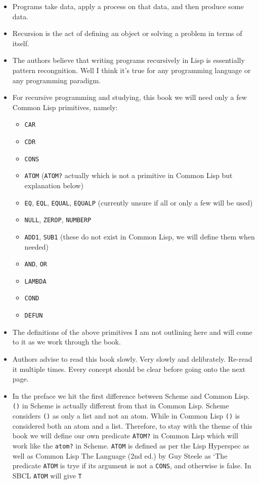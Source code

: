 \documentclass[11pt]{article}
\begin{document}
\begin{itemize}
\item Programs take data, apply a process on that data, and then produce some data.
\item Recursion is the act of defining an object or solving a problem in terms of itself.
\item The authors believe that writing programs recursively in Lisp is essentially pattern recongnition. Well I think
it's true for any programming language or any programming paradigm.
\item For recursive programming and studying, this book we will need only a few Common Lisp primitives, namely:
\begin{itemize}
\item \texttt{CAR}
\item \texttt{CDR}
\item \texttt{CONS}
\item \texttt{ATOM} (\texttt{ATOM?} actually which is not a primitive in Common Lisp but explanation below)
\item \texttt{EQ}, \texttt{EQL}, \texttt{EQUAL}, \texttt{EQUALP} (currently unsure if all or only a few will be used)
\item \texttt{NULL}, \texttt{ZEROP}, \texttt{NUMBERP}
\item \texttt{ADD1}, \texttt{SUB1} (these do not exist in Common Lisp, we will define them when needed)
\item \texttt{AND}, \texttt{OR}
\item \texttt{LAMBDA}
\item \texttt{COND}
\item \texttt{DEFUN}
\end{itemize}
\item The definitions of the above primitives I am not outlining here and will come to it as we work through the book.
\item Authors advise to read this book slowly. Very slowly and delibrately. Re-read it multiple times. Every concept
should be clear before going onto the next page.
\item In the preface we hit the first difference between Scheme and Common Lisp. \texttt{()} in Scheme is actually different
from that in Common Lisp. Scheme considers \texttt{()} as only a list and not an atom. While in Common Lisp \texttt{()} is
considered both an atom and a list. Therefore, to stay with the theme of this book we will define our own
predicate \texttt{ATOM?} in Common Lisp which will work like the \texttt{atom?} in Scheme. \texttt{ATOM} is defined as per the Lisp
Hyperspec as well as Common Lisp The Language (2nd ed.) by Guy Steele as `The predicate \texttt{ATOM} is trye if its
argument is not a \texttt{CONS}, and otherwise is false. In SBCL  \texttt{ATOM} will give \texttt{T}


\end{itemize}
\end{document}
